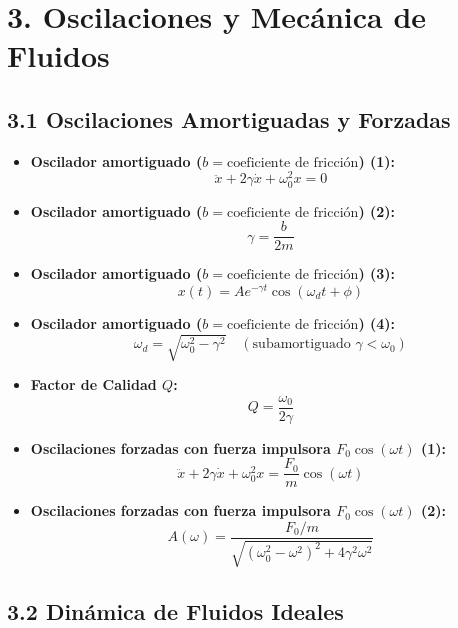 \documentclass[11pt,a4paper]{article}
\begin{document}
\section*{3. Oscilaciones y Mecánica de Fluidos}

\subsection*{3.1 Oscilaciones Amortiguadas y Forzadas}

\begin{itemize}
  \item \textbf{Oscilador amortiguado ($b = \text{coeficiente de fricción}$) (1):}
  \[
    \ddot{x} + 2\gamma \dot{x} + \omega_0^2 x = 0
  \]
  \item \textbf{Oscilador amortiguado ($b = \text{coeficiente de fricción}$) (2):}
  \[
    \gamma = \frac{b}{2m}
  \]
  \item \textbf{Oscilador amortiguado ($b = \text{coeficiente de fricción}$) (3):}
  \[
    x(t) = A e^{-\gamma t} \cos(\omega_d t + \phi)
  \]
  \item \textbf{Oscilador amortiguado ($b = \text{coeficiente de fricción}$) (4):}
  \[
    \omega_d = \sqrt{\omega_0^2 - \gamma^2} \quad (\text{subamortiguado } \gamma < \omega_0)
  \]
  \item \textbf{Factor de Calidad $Q$:}
  \[
    Q = \frac{\omega_0}{2\gamma}
  \]
  \item \textbf{Oscilaciones forzadas con fuerza impulsora $F_0 \cos(\omega t)$ (1):}
  \[
    \ddot{x} + 2\gamma \dot{x} + \omega_0^2 x = \frac{F_0}{m} \cos(\omega t)
  \]
  \item \textbf{Oscilaciones forzadas con fuerza impulsora $F_0 \cos(\omega t)$ (2):}
  \[
    A(\omega) = \frac{F_0 / m}{\sqrt{(\omega_0^2 - \omega^2)^2 + 4\gamma^2 \omega^2}}
  \]
\end{itemize}

\subsection*{3.2 Dinámica de Fluidos Ideales}
\end{document}
